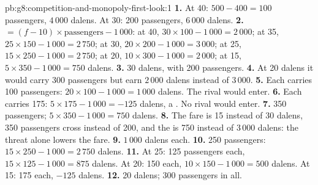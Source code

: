 \begin{solution}{pb:g8:competition-and-monopoly-first-look:1}
\textbf{1.} At 40: $500 - 400 = 100$ passengers,  $4\,000$ dalens. At 30: 200 passengers,
 $6\,000$ dalens.
\textbf{2.}  $= (f - 10) \times \text{passengers} - 1\,000$: at 40, $30 \times 100 - 1\,000 =
2\,000$; at 35, $25 \times 150 - 1\,000 = 2\,750$; at 30, $20 \times 200 - 1\,000 = 3\,000$; at 25,
$15 \times 250 - 1\,000 = 2\,750$; at 20, $10 \times 300 - 1\,000 = 2\,000$; at 15, $5 \times 350 -
1\,000 = 750$ dalens.
\textbf{3.} 30 dalens, with 200 passengers.
\textbf{4.} At 20 dalens it would carry 300 passengers but earn $2\,000$ dalens instead of $3\,000$.
\textbf{5.} Each carries 100 passengers: $20 \times 100 - 1\,000 = 1\,000$ dalens. The rival would enter.
\textbf{6.} Each carries 175: $5 \times 175 - 1\,000 = -125$ dalens, a . No rival would enter.
\textbf{7.} 350 passengers;  $5 \times 350 - 1\,000 = 750$ dalens.
\textbf{8.} The fare is 15 instead of 30 dalens, 350 passengers cross instead of 200, and the  is
750 instead of $3\,000$ dalens: the threat alone lowers the fare.
\textbf{9.} $1\,000$ dalens each.
\textbf{10.} 250 passengers: $15 \times 250 - 1\,000 = 2\,750$ dalens.
\textbf{11.} At 25: 125 passengers each, $15 \times 125 - 1\,000 = 875$ dalens. At 20: 150 each, $10 \times
150 - 1\,000 = 500$ dalens. At 15: 175 each, $-125$ dalens.
\textbf{12.} 20 dalens; 300 passengers in all.
\end{solution}
